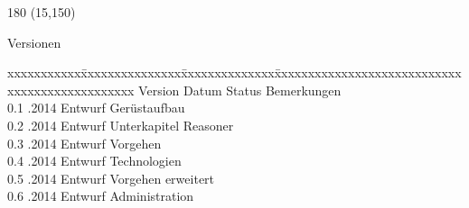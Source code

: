 
\begin{textblock}{180} (15,150)
\color{black}
\begin{huge}
Versionen
\end{huge}
\vspace{10mm}

\fontsize{10pt}{18pt}\selectfont
\begin{tabbing}
xxxxxxxxxxx\=xxxxxxxxxxxxxxx\=xxxxxxxxxxxxxx\=xxxxxxxxxxxxxxxxxxxxxxxxxxxxxxxxxxxxxxxxxxxxxxx \kill
Version	\> Datum	\> Status		\> Bemerkungen		\\
0.1	.2014	\> Entwurf		\> Gerüstaufbau	\\	
0.2	.2014	\> Entwurf		\> Unterkapitel Reasoner	\\	
0.3	.2014	\> Entwurf		\> Vorgehen	\\	
0.4	.2014	\> Entwurf		\> Technologien	\\
0.5	.2014	\> Entwurf		\> Vorgehen erweitert	\\	
0.6	.2014	\> Entwurf		\> Administration	\\ 
\end{tabbing}

\end{textblock}
